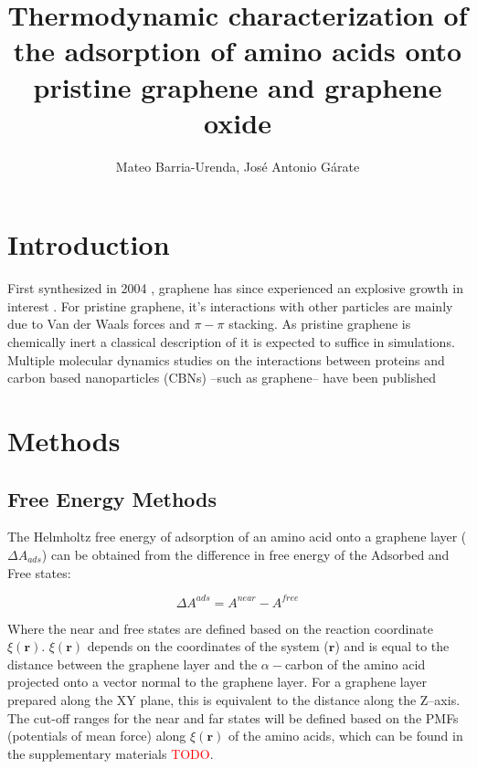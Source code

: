 \documentclass[twoside,twocolumn,9pt]{article}
\author{Mateo Barria-Urenda, José Antonio Gárate}
\title{Thermodynamic characterization of the adsorption of amino acids
  onto pristine graphene and graphene oxide}
\date{}
\begin{document}
\maketitle

\abstract{}

\section{Introduction}


First synthesized in 2004 \cite{Novoselov_2004}, graphene has since
experienced an explosive growth in interest \cite{Randviir_2014}.  For
pristine graphene, it's interactions with other particles are mainly
due to Van der Waals forces and $\pi-\pi$ stacking. \cite{Zuo_2012} As
pristine graphene is chemically inert \cite{Eftekhari_2017} a
classical description of it is expected to suffice in simulations.
Multiple molecular dynamics studies on the interactions between
proteins and carbon based nanoparticles (CBNs) --such as graphene--
have been published \cite{Zheng_2003, Ge_2011, Zuo_2012, Chong_2015,
  Duan_2015, Shityakov_2015, Al_Qattan_2018,Puigpelat_2019,
  Gonz_lez_Durruthy_2020, Li_2020}





\section{Methods}

\subsection{Free Energy Methods}

The Helmholtz free energy of adsorption of an amino acid onto a
graphene layer ($\Delta A_{ads}$) can be obtained from the difference
in free energy of the Adsorbed and Free states:

\begin{equation}
\label{eq:Adsorption}
\Delta A^{ads} = A^{near} - A^{free}
\end{equation}

Where the near and free states are defined based on the reaction
coordinate $\xi(\mathbf{r})$. $\xi(\mathbf{r})$ depends on the
coordinates of the system ($\mathbf{r}$) and is equal to the distance
between the graphene layer and the $\alpha-$carbon of the amino acid
projected onto a vector normal to the graphene layer. For a graphene
layer prepared along the XY plane, this is equivalent to the distance
along the Z--axis. The cut-off ranges for the near and far states will
be defined based on the PMFs (potentials of mean force) along $\xi(\mathbf{r})$ of
the amino acids, which can be found in the supplementary materials
\textcolor{red}{TODO}.
\end{document}
